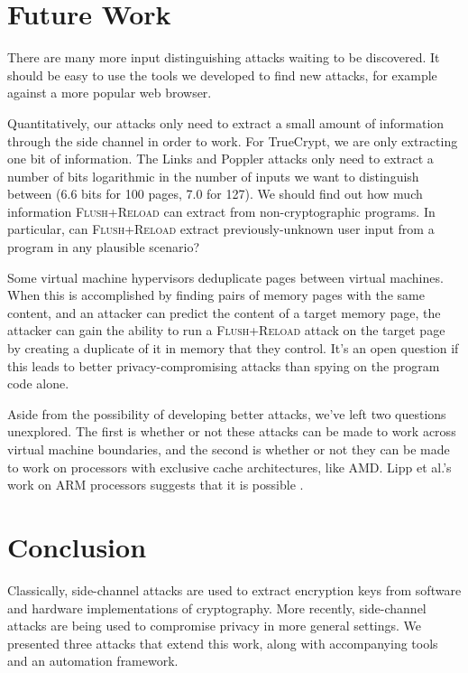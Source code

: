\documentclass[letterpaper,twocolumn,10pt]{article}
\begin{document}
\section{Future Work}
\label{sec:future}

There are many more input distinguishing attacks waiting to be discovered. It
should be easy to use the tools we developed to find new attacks, for example
against a more popular web browser.

Quantitatively, our attacks only need to extract a small amount of information
through the side channel in order to work. For TrueCrypt, we are only extracting
one bit of information. The Links and Poppler attacks only need to extract
a number of bits logarithmic in the number of inputs we want to distinguish
between (6.6 bits for 100 pages, 7.0 for 127). We should find out how much
information \textsc{Flush+Reload} can extract from non-cryptographic programs.
In particular, can \textsc{Flush+Reload} extract previously-unknown user input
from a program in any plausible scenario?

Some virtual machine hypervisors deduplicate pages between virtual machines.
When this is accomplished by finding pairs of memory pages with the same
content, and an attacker can predict the content of a target memory page, the
attacker can gain the ability to run a \textsc{Flush+Reload} attack on the
target page by creating a duplicate of it in memory that they control. It's an
open question if this leads to better privacy-compromising attacks than spying
on the program code alone.

Aside from the possibility of developing better attacks, we've left two
questions unexplored. The first is whether or not these attacks can be made to
work across virtual machine boundaries, and the second is whether or not they
can be made to work on processors with exclusive cache architectures, like AMD.
Lipp et al.'s work on ARM processors suggests that it is possible
\cite{lipp2015armageddon}.

\section{Conclusion}
\label{sec:conclusion}

Classically, side-channel attacks are used to extract encryption keys from
software and hardware implementations of cryptography. More recently,
side-channel attacks are being used to compromise privacy in more general
settings. We presented three attacks that extend this work, along with
accompanying tools and an automation framework.
\end{document}
